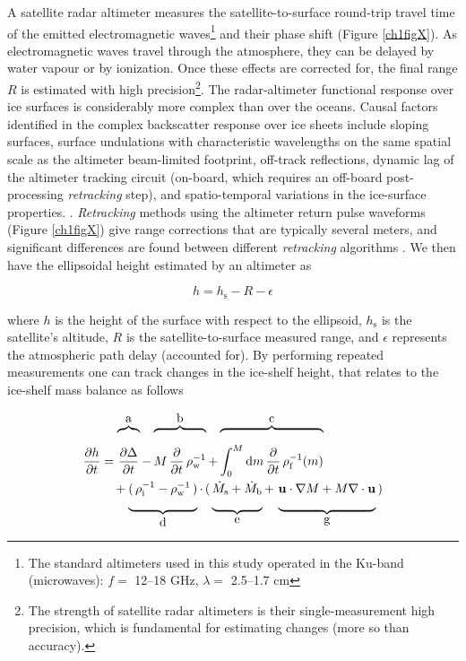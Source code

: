 A satellite radar altimeter measures the satellite-to-surface round-trip travel time of the emitted electromagnetic waves\footnote{The standard altimeters used in this study operated in the Ku-band (microwaves): $f =$ 12--18 GHz, $\lambda =$ 2.5--1.7 cm} and their phase shift (Figure \ref{ch1figX}). As electromagnetic waves travel through the atmosphere, they can be delayed by water vapour or by ionization. Once these effects are corrected for, the final range $R$ is estimated with high precision\footnote{The strength of satellite radar altimeters is their single-measurement high precision, which is fundamental for estimating changes (more so than accuracy).}. The radar-altimeter functional response over ice surfaces is considerably more complex than over the oceans. Causal factors identified in the complex backscatter response over ice sheets include sloping surfaces, surface undulations with characteristic wavelengths on the same spatial scale as the altimeter beam-limited footprint, off-track reflections, dynamic lag of the altimeter tracking circuit (on-board, which requires an off-board post-processing \emph{retracking} step), and spatio-temporal variations in the ice-surface properties. \parencite{Martin1983}. \emph{Retracking} methods using the altimeter return pulse waveforms (Figure \ref{ch1figX}) give range corrections that are typically several meters, and significant differences are found between different \emph{retracking} algorithms \parencite{Davis1996}. We then have the ellipsoidal height estimated by an altimeter as

\begin{equation}
  h = h_\text{s} - R - \epsilon
\end{equation}

where $h$ is the height of the surface with respect to the ellipsoid, $h_\text{s}$ is the satellite's altitude, $R$ is the satellite-to-surface measured range, and $\epsilon$ represents the atmospheric path delay (accounted for). By performing repeated measurements one can track changes in the ice-shelf height, that relates to the ice-shelf mass balance as follows

\begin{equation}
\begin{split}
  \frac{\partial h}{\partial t} &= 
    \overbrace{
      \frac{\partial \Delta}{\partial t}
      \rule[20pt]{0pt}{5pt}}^{\mbox{a}}
    -\overbrace{
      M \, \frac{\partial}{\partial t} \, \rho^{-1}_\text{w}
      \rule[20pt]{0pt}{5pt}}^{\mbox{b}}
    +\overbrace{
      \int^M_0 \text{d}m \, \frac{\partial}{\partial t} \, \rho^{-1}_\text{f}(m)
      \rule[20pt]{0pt}{5pt}}^{\mbox{c}} \\
    &\quad +\underbrace{
      ( \, \rho^{-1}_\text{i} - \rho^{-1}_\text{w} \, ) 
      \rule[-11pt]{0pt}{5pt}}_{\mbox{d}}
    \cdot \, ( \, 
      \underbrace{ \dot{M}_\text{s} + \dot{M}_\text{b}
      \rule[-11pt]{0pt}{5pt}}_{\mbox{e}}
      + \, 
      \underbrace{ \vect{u} \cdot \nabla M + M \nabla \cdot \vect{u} 
      \rule[-11pt]{0pt}{5pt}}_{\mbox{g}}
    \, )
\end{split}
\end{equation}

